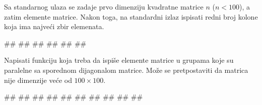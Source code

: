 \begin{Exercise}[label=p1.2_] 
Sa standarnog ulaza se zadaje prvo dimenziju kvadratne matrice $n$ ($n
< 100$), a zatim elemente matrice.  Nakon toga, na standardni izlaz
ispisati redni broj kolone koja ima najve\' ci zbir elemenata. \\
\begin{miditest}
\begin{upotreba}{1}
#\naslovInt#
##
##
##
##
##
\end{upotreba}
\end{miditest}
\end{Exercise}
\begin{Answer}[ref=p1.2_]
\end{Answer}


\begin{Exercise}[label=p1.2_] 
Napisati funkciju koja treba da ispi\v{s}e elemente matrice u grupama
koje su paralelne sa sporednom dijagonalom matrice. Mo\v{z}e se
pretpostaviti da matrica nije dimenzije ve\'ce od $100 \times 100$. \\
\begin{miditest}
\begin{upotreba}{1}
#\naslovInt#
##
##
##
##
##
##
##
##
##
\end{upotreba}
\end{miditest}
\end{Exercise}
\begin{Answer}[ref=p1.2_]
\end{Answer}


